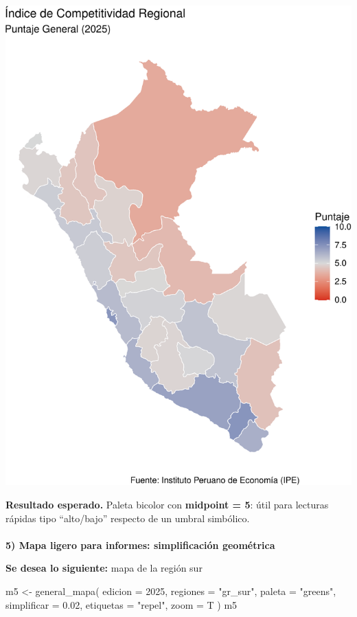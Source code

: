 \documentclass[
  11pt,
  letterpaper,
  DIV=11,
  numbers=noendperiod]{scrartcl}
\makeatletter
\let\oldparagraph\paragraph
\renewcommand{\paragraph}{
    \@ifstar
      \xxxParagraphStar
      \xxxParagraphNoStar
  }
\newcommand{\xxxParagraphStar}[1]{\oldparagraph*{#1}\mbox{}}
\newcommand{\xxxParagraphNoStar}[1]{\oldparagraph{#1}\mbox{}}
\newenvironment{Shaded}{\begin{snugshade}}{\end{snugshade}}
\newcommand{\AttributeTok}[1]{\textcolor[rgb]{0.40,0.45,0.13}{#1}}
\newcommand{\DecValTok}[1]{\textcolor[rgb]{0.68,0.00,0.00}{#1}}
\newcommand{\FloatTok}[1]{\textcolor[rgb]{0.68,0.00,0.00}{#1}}
\newcommand{\FunctionTok}[1]{\textcolor[rgb]{0.28,0.35,0.67}{#1}}
\newcommand{\NormalTok}[1]{\textcolor[rgb]{0.00,0.23,0.31}{#1}}
\newcommand{\OtherTok}[1]{\textcolor[rgb]{0.00,0.23,0.31}{#1}}
\newcommand{\StringTok}[1]{\textcolor[rgb]{0.13,0.47,0.30}{#1}}
\makeatother
\begin{document}
\includegraphics{Manual_files/figure-pdf/unnamed-chunk-45-1.pdf}

\textbf{Resultado esperado.} Paleta bicolor con \textbf{midpoint = 5}:
útil para lecturas rápidas tipo ``alto/bajo'' respecto de un umbral
simbólico.

\paragraph{\texorpdfstring{\textbf{5) Mapa ligero para informes:
simplificación
geométrica}}{5) Mapa ligero para informes: simplificación geométrica}}\label{mapa-ligero-para-informes-simplificaciuxf3n-geomuxe9trica}

\textbf{Se desea lo siguiente:} mapa de la región sur

\begin{Shaded}
\begin{Highlighting}[]
\NormalTok{m5 }\OtherTok{\textless{}{-}} \FunctionTok{general\_mapa}\NormalTok{(}
  \AttributeTok{edicion     =} \DecValTok{2025}\NormalTok{,}
  \AttributeTok{regiones    =} \StringTok{"gr\_sur"}\NormalTok{,}
  \AttributeTok{paleta      =} \StringTok{"greens"}\NormalTok{,}
  \AttributeTok{simplificar =} \FloatTok{0.02}\NormalTok{,}
  \AttributeTok{etiquetas   =} \StringTok{"repel"}\NormalTok{,}
  \AttributeTok{zoom =}\NormalTok{ T}
\NormalTok{)}
\NormalTok{m5}
\end{Highlighting}
\end{Shaded}
\end{document}
